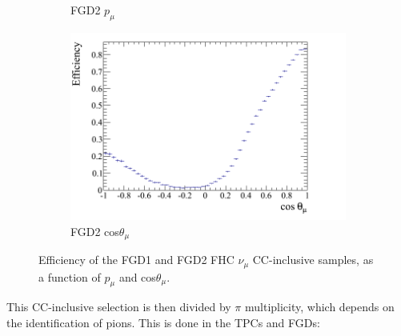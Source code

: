 \begin{figure}
\begin{subfigure}{.49\textwidth}
  \caption{FGD2 $p_{\mu}$}
\end{subfigure}
\begin{subfigure}{.49\textwidth}
  \centering
  \includegraphics[width=1.0\linewidth]{figs/effcosfgd2numu}
  \caption{FGD2 cos$\theta_{\mu}$}
\end{subfigure}
\caption{Efficiency of the FGD1 and FGD2 FHC $\nu_{\mu}$ CC-inclusive samples, as a function of $p_{\mu}$ and cos$\theta_{\mu}$.}
\label{fig:numueff}
\end{figure}

This CC-inclusive selection is then divided by $\pi$ multiplicity, which depends on the identification of pions. This is done in the TPCs and FGDs:

